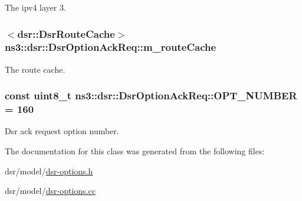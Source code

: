 The ipv4 layer 3. 

\subsubsection[{\texorpdfstring{m\+\_\+route\+Cache}{m_routeCache}}]{$<${\bf dsr\+::\+Dsr\+Route\+Cache}$>$ ns3\+::dsr\+::\+Dsr\+Option\+Ack\+Req\+::m\+\_\+route\+Cache\hspace{0.3cm}{\ttfamily [private]}}\hypertarget{classns3_1_1dsr_1_1DsrOptionAckReq_a5f19e75a872208c9910702d56e39430a}{}\label{classns3_1_1dsr_1_1DsrOptionAckReq_a5f19e75a872208c9910702d56e39430a}


The route cache. 

\subsubsection[{\texorpdfstring{O\+P\+T\+\_\+\+N\+U\+M\+B\+ER}{OPT_NUMBER}}]{\setlength{\rightskip}{0pt plus 5cm}const uint8\+\_\+t ns3\+::dsr\+::\+Dsr\+Option\+Ack\+Req\+::\+O\+P\+T\+\_\+\+N\+U\+M\+B\+ER = 160\hspace{0.3cm}{\ttfamily [static]}}\hypertarget{classns3_1_1dsr_1_1DsrOptionAckReq_a57823bec17c2c58a4f95a673528e877c}{}\label{classns3_1_1dsr_1_1DsrOptionAckReq_a57823bec17c2c58a4f95a673528e877c}


Dsr ack request option number. 



The documentation for this class was generated from the following files\+:\begin{DoxyCompactItemize}
\item 
dsr/model/\hyperlink{dsr-options_8h}{dsr-\/options.\+h}\item 
dsr/model/\hyperlink{dsr-options_8cc}{dsr-\/options.\+cc}\end{DoxyCompactItemize}
